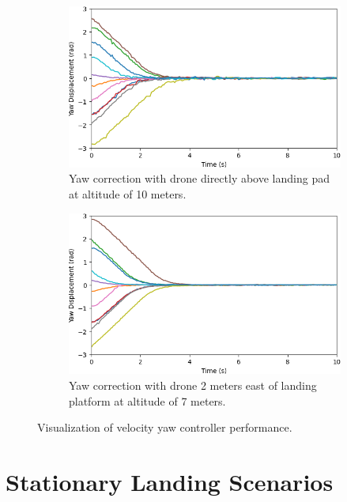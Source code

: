\begin{figure}[ht]
    \centering
    \begin{subfigure}[b]{0.45\textwidth}
        \centering
        \includegraphics[width=\textwidth]{images/yaw_pid_testing_east_0.png}
        \caption{Yaw correction with drone directly above landing pad at altitude of 10 meters.}
        \label{subfig:yaw_pid_testing_east_0}
    \end{subfigure}
    \begin{subfigure}[b]{0.45\textwidth}
        \centering
        \includegraphics[width=\textwidth]{images/yaw_pid_testing_east_2.png}
        \caption{Yaw correction with drone 2 meters east of landing platform at altitude of 7 meters.}
        \label{subfig:yaw_pid_testing_east_2}
    \end{subfigure}
    \caption{Visualization of velocity yaw controller performance.}
    \label{fig:initial_yaw_tuning}
\end{figure}

\section{Stationary Landing Scenarios}
\label{subsection:stationary_landing_scenarios}

